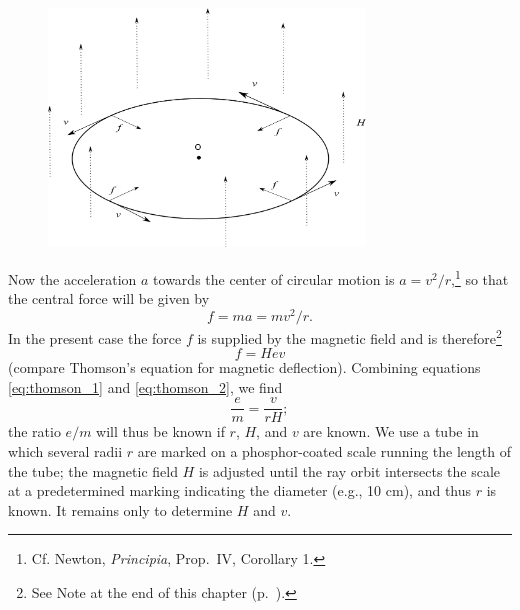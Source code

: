 \begin{figure}[htp]
\centering
    \includegraphics[width=0.75\textwidth]{images/02_thomson/image099.png}
\caption{}
\label{fig:thomson_3}
\end{figure}

Now the acceleration $a$ towards the center of circular motion is
$a = v^2/r$,\footnote{Cf. Newton, \emph{Principia},
  Prop.\ IV, Corollary 1.} so that the central force will be given by
%
\begin{equation}
f = ma = mv^2/r.\label{eq:thomson_1}
\end{equation}
%
In the present case the force $f$ is supplied by the magnetic field
and is therefore\footnote{See Note at the end of this chapter (p.~\pageref{n:thomson}).}
\begin{equation}
f = Hev\label{eq:thomson_2}
\end{equation}
(compare Thomson's equation for magnetic deflection). Combining
equations \eqref{eq:thomson_1} and \eqref{eq:thomson_2}, we find
\begin{equation}
\frac{e}{m} = \frac{v}{rH};\label{eq:thomson_3}
\end{equation}
the ratio $e/m$ will thus be known if $r$, $H$, and
$v$ are known. We use a tube in which several radii $r$
are marked on a phosphor-coated scale running the length of the tube; 
the magnetic field $H$ is adjusted
until the ray orbit intersects the scale at a predetermined marking indicating 
the diameter (e.g., 10 cm), and thus $r$ is
known. It remains only to determine $H$ and $v$.

